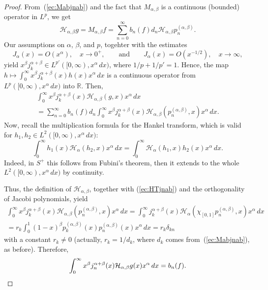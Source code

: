 \documentclass[12pt,leqno]{amsart}
\theoremstyle{plain}
\newcommand{\htra}{\mathcal{H}_\alpha} %
\newcommand{\hab}{\mathcal{H}_{\alpha,\beta}}
\newcommand{\ab}{{(\alpha,\beta)}} %
\begin{document}
\begin{proof}
{}From~(\ref{ec:Mabjnab}) and the fact that $M_{\alpha,\beta}$ is a
continuous (bounded) operator in $L^p$, we get
\begin{equation*}
   \hab g = M_{\alpha,\beta}f
    = \sum_{n=0}^{\infty} b_n(f)d_n \hab p_n^\ab.
\end{equation*}
Our assumptions on $\alpha$, $\beta$, and $p$, togehter with the estimates
\begin{equation*}
    J_\alpha(x) = O(x^\alpha), \quad x\to0^+,
    \qquad\text{and}\qquad
    J_\alpha(x) = O(x^{-1/2}), \quad x\to\infty,
\end{equation*}
yield $x^\beta j_k^{\alpha+\beta} \in L^{p'}([0,\infty),x^\alpha\,dx)$, where
$1/p+1/p'=1$. Hence, the map $h \mapsto \int_0^\infty x^\beta
j_k^{\alpha+\beta}(x)h(x)x^\alpha\,dx$ is a continuous operator from
$L^p([0,\infty),x^\alpha\,dx)$ into $\mathbb{R}$. Then,
\begin{multline*}
    \int_0^\infty x^\beta j_k^{\alpha+\beta}(x) \hab(g,x) x^\alpha\,dx
    \\
    = \sum_{n=0}^\infty b_n(f) d_n
    \int_0^\infty x^\beta j_k^{\alpha+\beta}(x) \hab(p_n^\ab,x) x^\alpha\,dx.
\end{multline*}
Now, recall the multiplication formula for the Hankel transform, which is
valid for $h_1, h_2 \in L^2([0,\infty),x^\alpha\,dx)$:
\begin{equation*}
    \int_0^\infty h_1(x) \htra(h_2,x) x^\alpha\,dx
    = \int_0^\infty \htra(h_1,x) h_2(x)x^\alpha\,dx.
\end{equation*}
Indeed, in $S^+$ this follows from Fubini's theorem, then it extends to the
whole $L^2([0,\infty),x^\alpha\,dx)$ by continuity.

Thus, the definition of $\hab$, together with (\ref{ec:HTjnab}) and the
orthogonality of Jacobi polynomials, yield
\begin{gather*}
    \int_0^\infty x^\beta j_k^{\alpha+\beta}(x) \hab(p_n^\ab,x) x^\alpha\,dx
    = \int_0^\infty j_k^{\alpha+\beta}(x) \htra(\chi_{[0,1]}p_n^\ab,x)
          x^\alpha\,dx \\
    = r_k \int_0^1 (1-x)^\beta p_k^\ab(x) p_n^\ab(x) x^\alpha\,dx
    = r_k \delta_{kn}
\end{gather*}
with a constant $r_k\ne0$ (actually, $r_k = 1/d_k$, where $d_k$
comes from~(\ref{ec:Mabjnab}), as before). Therefore,
\begin{equation*}
    \int_0^\infty x^\beta j_n^{\alpha+\beta}(x) \hab g(x) x^\alpha\,dx
   = b_n(f).
   \qedhere
\end{equation*}
\end{proof}
\end{document}
